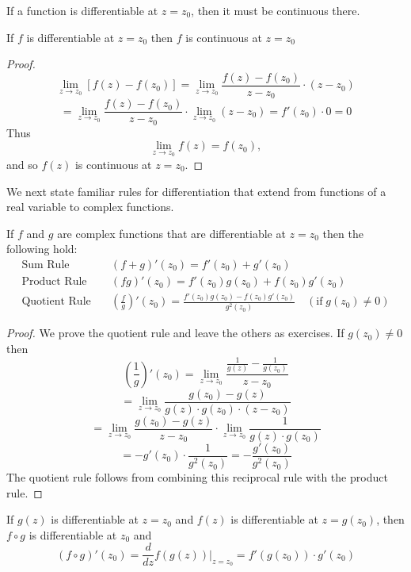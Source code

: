 \documentclass[handout]{ximera}
\begin{document}
If a function is differentiable at $z= z_0$, then it must be continuous there.
\begin{theorem}
If $f$ is differentiable at $z = z_0$ then $f$ is continuous at $z = z_0$
\end{theorem}
\begin{proof}
\[
\lim_{z\to z_0} \left[f(z) - f(z_0)\right] = \lim_{z\to z_0} \frac{f(z) - f(z_0)}{z-z_0} \cdot (z-z_0)
\]
\[
= \lim_{z\to z_0} \frac{f(z) - f(z_0)}{z-z_0} \cdot \lim_{z\to z_0}(z-z_0) = f'(z_0) \cdot 0 = 0
\]
Thus
\[
 \lim_{z\to z_0} f(z) = f(z_0),
 \]
 and so $f(z)$ is continuous at $z = z_0$.
\end{proof}
We next state familiar rules for differentiation that extend from functions of a real variable to complex functions.

\begin{theorem}
If $f$ and $g$ are complex functions that are differentiable at $z = z_0$ then the following hold:
\begin{align*}
\mbox{Sum Rule} & \quad (f+g)'(z_0) = f'(z_0) + g'(z_0)\\[6 pt]
\mbox{Product Rule} & \quad (fg)'(z_0) = f'(z_0)g(z_0) + f(z_0)g'(z_0)\\[6pt]
\mbox{Quotient Rule} &\quad \left (\frac{f}{g}\right)'(z_0) = \frac{f'(z_0)g(z_0) - f(z_0)g'(z_0)}{g^2(z_0)}\quad (\mbox{if} \; g(z_0) \neq 0)
\end{align*}
\end{theorem}

\begin{proof}
We prove the quotient rule and leave the others as exercises. If $g(z_0) \neq 0$ then
\[
\left(\frac{1}{g}\right)'(z_0) = \lim_{z \to z_0} \frac{\frac{1}{g(z)} - \frac{1}{g(z_0)}}{z-z_0}
\]
\[
= \lim_{z \to z_0} \frac{g(z_0)- g(z)}{g(z)\cdot g(z_0) \cdot(z-z_0)}
\]
\[
= \lim_{z \to z_0} \frac{g(z_0)- g(z)}{z-z_0}   \cdot \lim_{z \to z_0} \frac{1}{g(z)\cdot g(z_0)}
\]
\[
= -g'(z_0) \cdot \frac{1}{g^2(z_0)} = -\frac{g'(z_0)}{g^2(z_0)}
\]
The quotient rule follows from combining this reciprocal rule with the product rule.

\end{proof}

\begin{theorem}
If $g(z)$ is differentiable at $z = z_0$ and $f(z)$ is differentiable at $z = g(z_0)$, then
$f \circ g$ is differentiable at $z_0$ and
\[
(f\circ g)'(z_0) = \frac{d}{dz} f(g(z)) \Big|_{z=z_0} = f'(g(z_0)) \cdot g'(z_0)
\]
\end{theorem}
\end{document}
